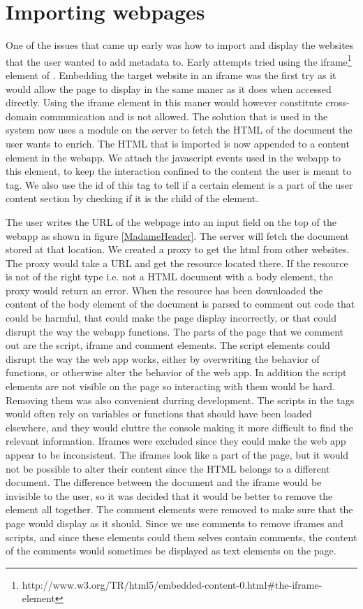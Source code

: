 \section{Importing webpages}
One of the issues that came up early was how to import and display the websites that the user wanted to add metadata to.
Early attempts tried using the iframe\footnote{http://www.w3.org/TR/html5/embedded-content-0.html\#the-iframe-element}
element of .
Embedding the target website in an iframe was the first try as it would allow the page to display in the same maner
as it does when accessed directly.
Using the iframe element in this maner would however constitute cross-domain communication and is not allowed.
The solution that is used in the system now uses a module on the server to fetch the HTML of the document the user wants to enrich.
The HTML that is imported is now appended to a content element in the webapp.
We attach the javascript events used in the webapp to this element,
to keep the interaction confined to the content the user is meant to tag.
We also use the id of this tag to tell if a certain element is a part of the user content section by checking if it is
the child of the element.

The user writes the URL of the webpage into an input field on the top of the webapp as shown in figure \ref{MadameHeader}.
The server will fetch the document stored at that location.
We created a proxy to get the html from other websites.
The proxy would take a URL and get the resource located there.
If the resource is not of the right type i.e. not a HTML document with a body element,
the proxy would return an error.
When the resource has been downloaded the content of the body element of the document is parsed to comment out code that
could be harmful, that could make the page display incorrectly, or that could disrupt the way the webapp functions.
The parts of the page that we comment out are the script, iframe and comment elements.
The script elements could disrupt the way the web app works, either by overwriting the behavior of functions,
or otherwise alter the behavior of the web app.
In addition the script elements are not visible on the page so interacting with them would be hard.
Removing them was also convenient durring development.
The scripts in the tags would often rely on variables or functions that should have been loaded elsewhere,
and they would cluttre the console making it more difficult to find the relevant information.
Iframes were excluded since they could make the web app appear to be inconsistent.
The iframes look like a part of the page,
but it would not be possible to alter their content since the HTML belongs to a different document.
The difference between the document and the iframe would be invisible to the user,
so it was decided that it would be better to remove the element all together.
The comment elements were removed to make sure that the page would display as it should.
Since we use comments to remove iframes and scripts, and since these elements could them selves contain comments,
the content of the comments would sometimes be displayed as text elements on the page.

